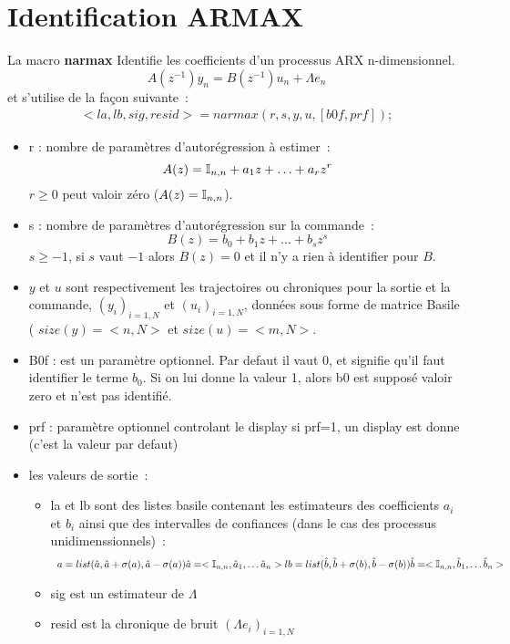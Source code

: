  
\section{Identification ARMAX}

La macro {\bf narmax} Identifie les coefficients d'un processus ARX  n-dimensionnel. 
\begin{equation}
	A(z^{-1}) y_{n}= B(z^{-1})u_{n} +  \Lambda e_{n}
\end{equation}
et s'utilise de la fa\c{c}on suivante~:
\begin{equation}
	\begin{array}{l}
	<la,lb,sig,resid>=narmax(r,s,y,u,[b0f,prf]);	
	\end{array}
\end{equation}
\begin{itemize}
\item r : nombre de param\`etres d'autor\'egression \`a estimer~:
\begin{equation}
	A(z)= {\Bbb I}_{n,n}+ a_{1}z+\ldots +a_{r}z^r
\end{equation}
$r \ge 0$ peut valoir z\'ero ($A(z)={\Bbb I}_{n,n}$).
\item s : nombre de param\`etres d'autor\'egression sur la commande~:
\begin{equation}
	B(z)= b_{0}+ b_{1}z+\ldots +b_{s}z^s
\end{equation}
$s \ge -1$, si $s$ vaut $-1$ alors $B(z)=0$ et il n'y a rien \`a identifier pour $B$. 
\item $y$ et $u$ sont respectivement les trajectoires ou chroniques pour la sortie et la commande, $(y_{i})_{i=1,N}$ et $(u_{i})_{i=1,N}$, donn\'ees sous forme de matrice Basile ( $size(y)=<n,N>$  et $size(u)=<m,N>$.
\item B0f : est un param\`etre optionnel. Par defaut il vaut 
         0, et signifie qu'il faut identifier le terme $b_{0}$. Si on lui 
         donne la valeur 1, alors b0 est suppos\'e valoir zero et 
	n'est pas identifi\'e.
\item    prf : param\`etre optionnel controlant le display
         si prf=1, un display est donne (c'est la valeur par defaut)
\item les valeurs de sortie~:
\begin{itemize}
	\item  la et lb sont des listes basile contenant 
	les estimateurs des coefficients $a_{i}$ et $b_{i}$ ainsi que 
	des intervalles de confiances (dans le cas des processus unidimenssionnels)~:
\begin{equation}
	\begin{array}
	la=list(\hat{a},\hat{a}+\sigma(a),\hat{a}-\sigma(a))
	\hat{a}=< \I_{n,n} , \hat{a}_{1},\ldots \hat{a}_{n}>
	lb=list(\hat{b},\hat{b}+\sigma(b),\hat{b}-\sigma(b))
	\hat{b}=< \I_{n,n} , \hat{b}_{1},\ldots \hat{b}_{n}>
	\end{array}
\end{equation}
	\item sig est un estimateur de $\Lambda$
	\item resid  est la chronique de bruit $(\Lambda e_{i})_{i=1,N}$
\end{itemize}
\end{itemize}
